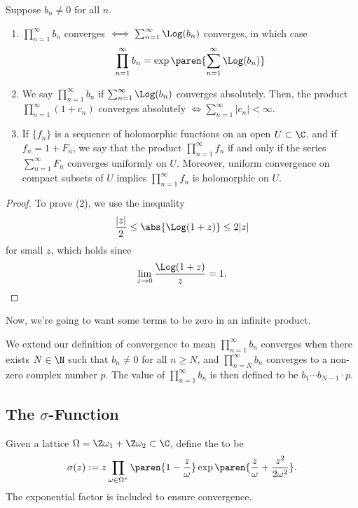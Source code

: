 \documentclass[11pt]{report}
\begin{document}
\begin{prop}
Suppose $b_n \neq 0$ for all $n$.
    \begin{enumerate}
    \item $\prod_{n=1}^\infty b_n$ converges $\iff \sum_{n=1}^\infty \Log(b_n)$ converges, in which case
    $$\prod_{n=1}^\infty b_n = \exp\paren{\sum_{n=1}^\infty \Log(b_n)}$$
    \item We say $\prod_{n=1}^\infty b_n$  if $\sum_{n=1}^\infty \Log(b_n)$ converges absolutely. Then, the product $\prod_{n=1}^\infty (1+c_n)$ converges absolutely $\iff \sum_{n=1}^\infty |c_n| < \infty$.
    \item If $\{f_n\}$ is a sequence of holomorphic functions on an open $U \subset \C$, and if $f_n = 1+F_n$, we say that the product $\prod_{n=1}^\infty f_n$  if and only if the series $\sum_{n=1}^\infty F_n$ converges uniformly on $U$. Moreover, uniform convergence on compact subsets of $U$ implies $\prod_{n=1}^\infty f_n$ is holomorphic on $U$.
\end{enumerate}
\end{prop}

\begin{proof}
    To prove (2), we use the inequality
    $$\frac{|z|}{2}\leq \abs{\Log(1+z)}\leq 2|z|$$
    for small $z$, which holds since
    $$\lim_{z \to 0}\frac{\Log(1+z)}{z}=1.$$
\end{proof}

Now, we're going to want some terms to be zero in an infinite product. 
\begin{defn}
We extend our definition of convergence to mean $\prod_{n=1}^\infty b_n$ converges when there exists $N \in \N$ such that $b_n \neq 0$ for all $n \geq N$, and $\prod_{n=N}^\infty b_n$ converges to a non-zero complex number $p$. The value of $\prod_{n=1}^\infty b_n$ is then defined to be $b_1\cdots b_{N-1}\cdot p$.    
\end{defn}

\subsection{\texorpdfstring{The $\sigma$-Function}{The sigma-Function}}

\begin{defn}
    Given a lattice $\Omega = \Z\omega_1 + \Z\omega_2 \subset \C$, define the  to be
    $$\sigma(z):=z\prod_{\omega \in \Omega^*}\paren{1-\frac{z}{\omega}}\exp\paren{\frac{z}{\omega
    }+\frac{z^2}{2\omega^2} }.$$
    The exponential factor is included to ensure convergence.
\end{defn}
\end{document}
